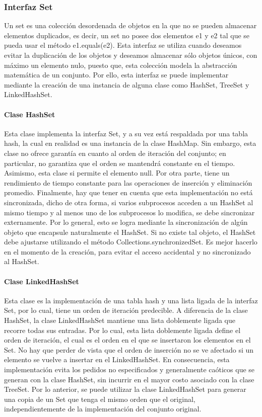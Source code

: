 \documentclass{report}
\begin{document}
\subsubsection{Interfaz Set}
Un set es una colección desordenada de objetos en la que no se pueden almacenar elementos duplicados, es decir, un set no posee dos elementos e1 y e2 tal que se pueda usar el método e1.equals(e2). Esta interfaz se utiliza cuando deseamos evitar la duplicación de los objetos y deseamos almacenar sólo objetos únicos, con máximo un elemento nulo, puesto que, esta colección modela la abstracción matemática de un conjunto. Por ello, esta interfaz se puede implementar mediante  la creación de una instancia de alguna clase como HashSet, TreeSet y LinkedHashSet.
\paragraph{Clase HashSet}
Esta clase implementa la interfaz Set, y a su vez está respaldada por una tabla hash, la cual en realidad es una instancia de la clase HashMap. Sin embargo, esta clase no ofrece garantía en cuanto al orden de iteración del conjunto; en particular, no garantiza que el orden se mantendrá constante en el tiempo. Asimismo, esta clase si permite el elemento null. Por otra parte, tiene un rendimiento de tiempo constante para las operaciones de inserción y eliminación promedio. Finalmente, hay que tener en cuenta que esta implementación no está sincronizada, dicho de otra forma, si varios subprocesos acceden a un HashSet al mismo tiempo y al menos uno de los subprocesos lo modifica, se debe sincronizar externamente.
Por lo general, esto se logra mediante la sincronización de algún objeto que encapsule naturalmente el HashSet. Si no existe tal objeto, el HashSet debe ajustarse utilizando el método Collections.synchronizedSet. Es mejor hacerlo en el momento de la creación, para evitar el acceso accidental y no sincronizado al HashSet.
\paragraph{Clase LinkedHashSet}
Esta clase es la implementación de una tabla hash y una lista ligada de la interfaz Set, por lo cual, tiene un orden de iteración predecible. A diferencia de la clase HashSet, la clase LinkedHashSet mantiene una lista doblemente ligada que recorre todas sus entradas. Por lo cual, esta lista doblemente ligada define el orden de iteración, el cual es el orden en el que se insertaron los elementos en el Set. No hay que perder de vista que el orden de inserción no se ve afectado si un elemento se vuelve a insertar en el LinkedHashSet. En consecuencia, esta implementación evita los pedidos no especificados y generalmente caóticos que se generan con la clase HashSet, sin incurrir en el mayor costo asociado con la clase TreeSet.
Por lo anterior, se puede utilizar la clase LinkedHashSet para generar una copia de un Set que tenga el mismo orden que el original, independientemente de la implementación del conjunto original.
\end{document}

